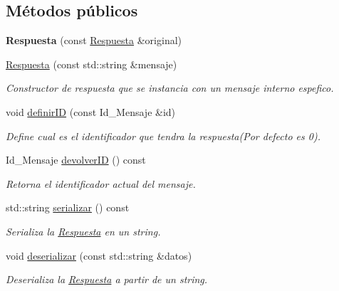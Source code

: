 \subsection*{\-Métodos públicos}
\begin{DoxyCompactItemize}
\item 
\hypertarget{classRespuesta_a2ca6cacd8ef5865b5b4e0de1045f8ef7}{{\bfseries \-Respuesta} (const \hyperlink{classRespuesta}{\-Respuesta} \&original)}\label{classRespuesta_a2ca6cacd8ef5865b5b4e0de1045f8ef7}

\item 
\hyperlink{classRespuesta_a1d2be7ba6c4e5fef6eaa75a8e870ff1a}{\-Respuesta} (const std\-::string \&mensaje)
\begin{DoxyCompactList}\small\item\em \-Constructor de respuesta que se instancia con un mensaje interno espefico. \end{DoxyCompactList}\item 
void \hyperlink{classRespuesta_abdde56c03b7f11e977cdd3617408fa43}{definir\-I\-D} (const \-Id\-\_\-\-Mensaje \&id)
\begin{DoxyCompactList}\small\item\em \-Define cual es el identificador que tendra la respuesta(\-Por defecto es 0). \end{DoxyCompactList}\item 
\-Id\-\_\-\-Mensaje \hyperlink{classRespuesta_af14e9c6d7a5de669a8a6012793da88e5}{devolver\-I\-D} () const 
\begin{DoxyCompactList}\small\item\em \-Retorna el identificador actual del mensaje. \end{DoxyCompactList}\item 
std\-::string \hyperlink{classRespuesta_a3705c87e5738e9612410cb3567caf54c}{serializar} () const 
\begin{DoxyCompactList}\small\item\em \-Serializa la \hyperlink{classRespuesta}{\-Respuesta} en un string. \end{DoxyCompactList}\item 
void \hyperlink{classRespuesta_ae0481de83f0bdb1fd13d25885ce6e310}{deserializar} (const std\-::string \&datos)
\begin{DoxyCompactList}\small\item\em \-Deserializa la \hyperlink{classRespuesta}{\-Respuesta} a partir de un string. \end{DoxyCompactList}\item 

\end{DoxyCompactItemize}
